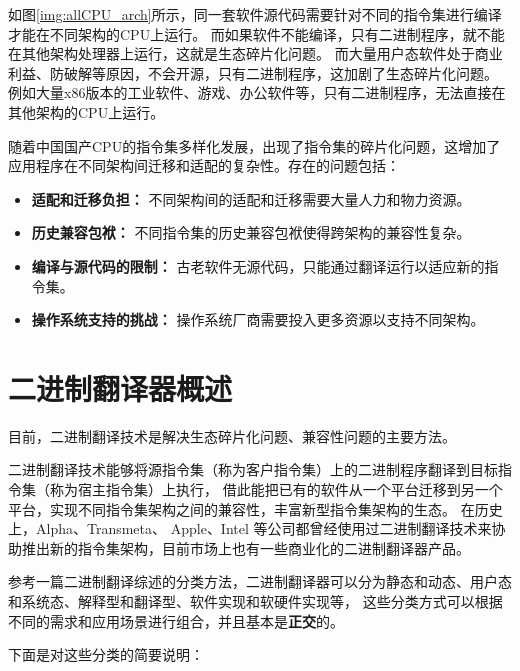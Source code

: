 如图\ref{img:allCPU_arch}所示，同一套软件源代码需要针对不同的指令集进行编译才能在不同架构的CPU上运行\footnotemark。
而如果软件不能编译，只有二进制程序，就不能在其他架构处理器上运行，这就是生态碎片化问题。
而大量用户态软件处于商业利益、防破解等原因，不会开源，只有二进制程序，这加剧了生态碎片化问题。
例如大量x86版本的工业软件、游戏、办公软件等，只有二进制程序，无法直接在其他架构的CPU上运行。


随着中国国产CPU的指令集多样化发展，出现了指令集的碎片化问题，这增加了应用程序在不同架构间迁移和适配的复杂性。存在的问题包括：
    \begin{itemize}
    \item \textbf{适配和迁移负担：} 不同架构间的适配和迁移需要大量人力和物力资源。
    
    \item \textbf{历史兼容包袱：} 不同指令集的历史兼容包袱使得跨架构的兼容性复杂。
    
    \item \textbf{编译与源代码的限制：} 古老软件无源代码，只能通过翻译运行以适应新的指令集。
    
    \item \textbf{操作系统支持的挑战：} 操作系统厂商需要投入更多资源以支持不同架构。
    \end{itemize}

\section{二进制翻译器概述}
目前，二进制翻译技术是解决生态碎片化问题、兼容性问题的主要方法。

二进制翻译技术能够将源指令集（称为客户指令集）上的二进制程序翻译到目标指令集（称为宿主指令集）上执行，
借此能把已有的软件从一个平台迁移到另一个平台，实现不同指令集架构之间的兼容性，丰富新型指令集架构的生态。
在历史上，Alpha\cite{chernoffFX32Profiledirected1998}、Transmeta\cite{dehnertTransmetaCodeMorphing2003}、
Apple\cite{RunningIntelBinaries}、Intel\cite{noauthor_intel_nodate}
等公司都曾经使用过二进制翻译技术来协助推出新的指令集架构，目前市场上也有一些商业化的二进制翻译器产品。

参考一篇二进制翻译综述的分类方法\cite{BT_review}，二进制翻译器可以分为静态和动态、用户态和系统态、解释型和翻译型、软件实现和软硬件实现等，
这些分类方式可以根据不同的需求和应用场景进行组合，并且基本是\textbf{正交}的。

下面是对这些分类的简要说明：

